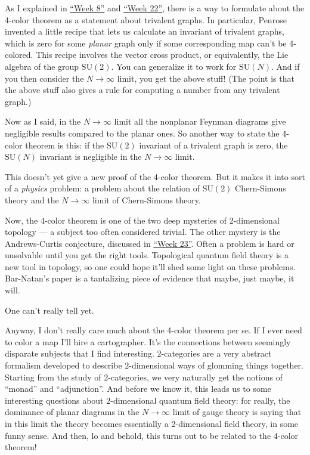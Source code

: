 \documentclass{article}
\begin{document}
As I explained in \protect\hyperlink{week8}{``Week 8''} and
\protect\hyperlink{week22}{``Week 22''}, there is a way to formulate
about the 4-color theorem as a statement about trivalent graphs. In
particular, Penrose invented a little recipe that lets us calculate an
invariant of trivalent graphs, which is zero for some \emph{planar}
graph only if some corresponding map can't be 4-colored. This recipe
involves the vector cross product, or equivalently, the Lie algebra of
the group \(\mathrm{SU}(2)\). You can generalize it to work for
\(\mathrm{SU}(N)\). And if you then consider the \(N\to\infty\) limit,
you get the above stuff! (The point is that the above stuff also gives a
rule for computing a number from any trivalent graph.)

Now as I said, in the \(N\to\infty\) limit all the nonplanar Feynman
diagrams give negligible results compared to the planar ones. So another
way to state the 4-color theorem is this: if the \(\mathrm{SU}(2)\)
invariant of a trivalent graph is zero, the \(\mathrm{SU}(N)\) invariant
is negligible in the \(N\to\infty\) limit.

This doesn't yet give a new proof of the 4-color theorem. But it makes
it into sort of a \emph{physics} problem: a problem about the relation
of \(\mathrm{SU}(2)\) Chern-Simons theory and the \(N\to\infty\) limit
of Chern-Simons theory.

Now, the 4-color theorem is one of the two deep mysteries of
2-dimensional topology --- a subject too often considered trivial. The
other mystery is the Andrews-Curtis conjecture, discussed in
\protect\hyperlink{week23}{``Week 23''}. Often a problem is hard or
unsolvable until you get the right tools. Topological quantum field
theory is a new tool in topology, so one could hope it'll shed some
light on these problems. Bar-Natan's paper is a tantalizing piece of
evidence that maybe, just maybe, it will.

One can't really tell yet.

Anyway, I don't really care much about the 4-color theorem per se. If I
ever need to color a map I'll hire a cartographer. It's the connections
between seemingly disparate subjects that I find interesting.
\(2\)-categories are a very abstract formalism developed to describe
\(2\)-dimensional ways of glomming things together. Starting from the
study of \(2\)-categories, we very naturally get the notions of
``monad'' and ``adjunction''. And before we know it, this leads us to
some interesting questions about \(2\)-dimensional quantum field theory:
for really, the dominance of planar diagrams in the \(N\to\infty\) limit
of gauge theory is saying that in this limit the theory becomes
essentially a 2-dimensional field theory, in some funny sense. And then,
lo and behold, this turns out to be related to the 4-color theorem!
\end{document}
